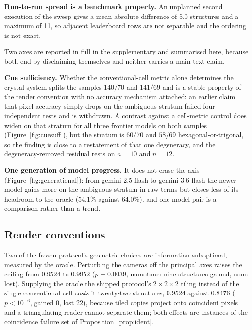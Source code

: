 \textbf{Run-to-run spread is a benchmark property.} An unplanned second execution of the sweep gives a mean
absolute difference of 5.0 structures and a maximum of 11, so adjacent leaderboard rows are not separable
and the ordering is not exact.

Two axes are reported in full in the supplementary and summarised here, because both end by disclaiming
themselves and neither carries a main-text claim.

\textbf{Cue sufficiency.} Whether the conventional-cell metric alone determines the crystal system splits
the samples $140/70$ and $141/69$ and is a stable property of the render convention with no accuracy
mechanism attached: an earlier claim that pixel accuracy simply drops on the ambiguous stratum failed four
independent tests and is withdrawn. A contrast against a cell-metric control does widen on that stratum for
all three frontier models on both samples (Figure~\ref{fig:cuesuff}), but the stratum is $60/70$ and
$58/69$ hexagonal-or-trigonal, so the finding is close to a restatement of that one degeneracy, and the
degeneracy-removed residual rests on $n=10$ and $n=12$.

\textbf{One generation of model progress.} It does not erase the axis (Figure~\ref{fig:generational}): from
gemini-2.5-flash to gemini-3.6-flash the newer model gains more on the ambiguous stratum in raw terms but
closes less of its headroom to the oracle (54.1\% against 64.0\%), and one model pair is a comparison
rather than a trend.

\subsection{Render conventions}
\label{sec:conventions}

Two of the frozen protocol's geometric choices are information-suboptimal, measured by the oracle.
Perturbing the cameras off the principal axes raises the ceiling from 0.9524 to 0.9952 ($p = 0.0039$,
monotone: nine structures gained, none lost). Supplying the oracle the shipped protocol's $2\times2\times2$ tiling instead of the single conventional cell
\emph{costs} it twenty-two structures, 0.9524 against 0.8476 ($p < 10^{-6}$, gained 0, lost 22), because
tiled copies project onto coincident pixels and a triangulating reader cannot separate them; both effects are instances
of the coincidence failure set of Proposition~\ref{prop:ident}.

